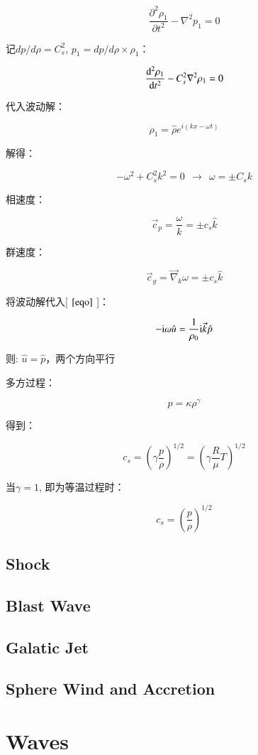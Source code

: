 \documentclass[fontset=windows]{report}
\begin{document}
\[\frac{\partial ^2 \rho_1}{\partial t ^2}-\nabla^2p_1=0\]

记\(dp/d\rho=C_s^2\), \(p_1=dp/d\rho\times\rho_1\)：

\[\frac{{\rm{d}}^2\rho_1}{{\rm{d}}t^2}-C_s^2\nabla^2\rho_1=0\]

代入波动解：

\[\rho_1=\hat \rho e^{i(kx-\omega t)}\]

解得：

\[-\omega^2+C_s^2k^2=0\ \ \rightarrow\ \ \omega=\pm C_s k\]

相速度：

\[\vec c_p=\frac{\omega}{k}=\pm c_s\hat k\]

群速度：

\[\vec c_g = \vec \nabla_k \omega=\pm c_s \hat k\]

将波动解代入{[} \(\ref{eqo}\) {]}：

\[-{\rm i}\omega\hat u=\frac{1}{\rho_0}{\rm i} \vec k \hat p\]

则: \(\hat u = \hat p\)，两个方向平行

多方过程：

\[p=\kappa \rho^{\gamma}\]

得到：

\[c_s=(\gamma \frac p\rho)^{1/2}=(\gamma\frac{R}{\mu}T)^{1/2}\]

当\(\gamma=1\), 即为等温过程时：

\[c_s=(\frac p \rho)^{1/2}\]

\section{Shock}

\section{Blast Wave}

\section{Galatic Jet}

\section{Sphere Wind and Accretion}



\chapter{Waves}
\end{document}
